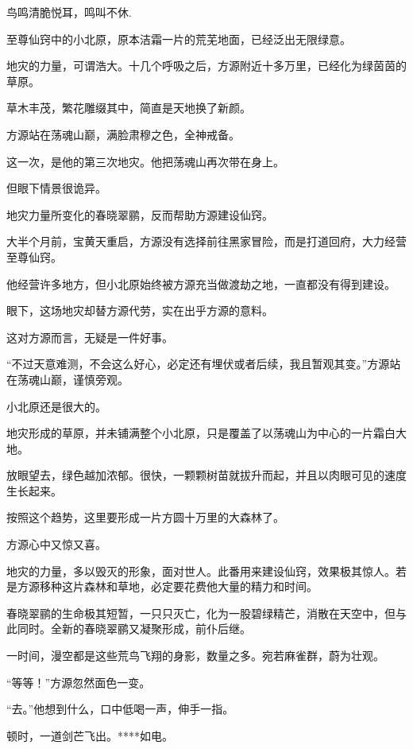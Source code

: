 
\begin{this_body}

鸟鸣清脆悦耳，鸣叫不休.

至尊仙窍中的小北原，原本洁霜一片的荒芜地面，已经泛出无限绿意。

地灾的力量，可谓浩大。十几个呼吸之后，方源附近十多万里，已经化为绿茵茵的草原。

草木丰茂，繁花雕缀其中，简直是天地换了新颜。

方源站在荡魂山巅，满脸肃穆之色，全神戒备。

这一次，是他的第三次地灾。他把荡魂山再次带在身上。

但眼下情景很诡异。

地灾力量所变化的春晓翠鹂，反而帮助方源建设仙窍。

大半个月前，宝黄天重启，方源没有选择前往黑家冒险，而是打道回府，大力经营至尊仙窍。

他经营许多地方，但小北原始终被方源充当做渡劫之地，一直都没有得到建设。

眼下，这场地灾却替方源代劳，实在出乎方源的意料。

这对方源而言，无疑是一件好事。

“不过天意难测，不会这么好心，必定还有埋伏或者后续，我且暂观其变。”方源站在荡魂山巅，谨慎旁观。

小北原还是很大的。

地灾形成的草原，并未铺满整个小北原，只是覆盖了以荡魂山为中心的一片霜白大地。

放眼望去，绿色越加浓郁。很快，一颗颗树苗就拔升而起，并且以肉眼可见的速度生长起来。

按照这个趋势，这里要形成一片方圆十万里的大森林了。

方源心中又惊又喜。

地灾的力量，多以毁灭的形象，面对世人。此番用来建设仙窍，效果极其惊人。若是方源移种这片森林和草地，必定要花费他大量的精力和时间。

春晓翠鹂的生命极其短暂，一只只灭亡，化为一股碧绿精芒，消散在天空中，但与此同时。全新的春晓翠鹂又凝聚形成，前仆后继。

一时间，漫空都是这些荒鸟飞翔的身影，数量之多。宛若麻雀群，蔚为壮观。

“等等！”方源忽然面色一变。

“去。”他想到什么，口中低喝一声，伸手一指。

顿时，一道剑芒飞出。****如电。


\end{this_body}
